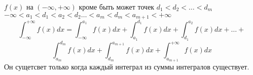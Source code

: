 \begin{defin}
    $f(x)$ на $(-\infty, +\infty)$ кроме быть может точек
    $d_1 < d_2 < \ldots < d_m$\\
    $-\infty < a_1 < d_1 < a_2 < d_2 \ldots < a_m < d_m < a_{m+1} < +\infty$
    \[
        \int_{-\infty}^{+\infty} f(x)dx = \int_{-\infty}^{a_1}f(x)dx +
        \int_{a_1}^{d_1}f(x)dx + \int_{d_1}^{a_2}f(x)dx + \ldots +
    \]
    \[
        \int_{a_m}^{d_m}f(x)dx + \int_{d_m}^{a_{m+1}}f(x)dx +
        \int_{a_{m+1}}^{+\infty}f(x)dx
    \]
        Он сущетсвет только когда каждый интеграл из суммы интегралов существует.
\end{defin}
